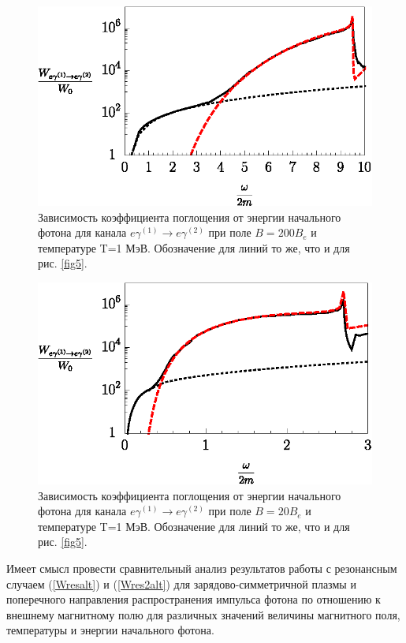 \documentclass[cp1251%
               ]{jetp} %
\begin{document}
\begin{figure}[t!]\centering
	\includegraphics[width=0.9\linewidth]{fig7.eps}
	\caption{Зависимость коэффициента поглощения от энергии начального фотона для канала $e\gamma^{(1)}\to e\gamma^{(2)}$ при поле $B=200 B_e$ и температуре T=1 МэВ. Обозначение для линий то же, что и для рис. \ref{fig5}.}
	\label{fig7}
\end{figure}
\begin{figure}[t!]\centering
	\includegraphics[width=0.9\linewidth]{fig8.eps}
	\caption{Зависимость коэффициента поглощения от энергии начального фотона для канала $e\gamma^{(1)}\to e\gamma^{(2)}$ при поле $B=20 B_e$ и температуре T=1 МэВ. Обозначение для линий то же, что и для рис. \ref{fig5}.}
	\label{fig8}
\end{figure}

Имеет смысл провести сравнительный анализ результатов работы \cite{Chistyakov:2009}  с резонансным случаем (\ref{Wresalt}) и (\ref{Wres2alt}) для зарядово-симметричной плазмы и поперечного направления распространения импульса фотона по отношению к внешнему магнитному полю для различных значений величины магнитного поля, температуры и энергии начального фотона.
\end{document}
